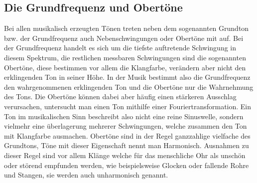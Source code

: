 \subsection*{Die Grundfrequenz und Obertöne}
\label{sec:Oberton} \label{sec:Nebenschwingung} \label{sec:Grundfrequenz}
Bei allen musikalisch erzeugten Tönen treten neben dem sogenannten Grundton bzw. der Grundfrequenz auch Nebenschwingungen oder Obertöne mit auf.
Bei der Grundfrequenz handelt es sich um die tiefste auftretende Schwingung in diesem Spektrum, die restlichen messbaren Schwingungen sind die sogenannten Obertöne, diese bestimmen vor allem die Klangfarbe, verändern aber nicht den erklingenden Ton in seiner Höhe.
In der Musik bestimmt also die Grundfrequenz den wahrgenommenen erklingenden Ton und die Obertöne nur die Wahrnehmung des Tons. Die Obertöne können dabei aber häufig einen stärkeren Ausschlag verursachen, untersucht man einen Ton mithilfe
einer Fouriertransformation. Ein Ton im musikalischen Sinn beschreibt also nicht eine reine Sinuswelle, sondern vielmehr eine überlagerung mehrerer Schwingungen, welche zusammen den Ton mit Klangfarbe ausmachen. Obertöne sind in der Regel ganzzahlige vielfache 
des Grundtons, Töne mit dieser Eigenschaft nennt man Harmonisch. Ausnahmen zu dieser Regel sind vor allem Klänge welche für das menschliche Ohr als unschön oder störend empfunden werden, wie
beispielsweise Glocken oder fallende Rohre und Stangen, sie werden auch unharmonisch genannt. \cite{abcmusik} \cite{harmonische_obertne}


